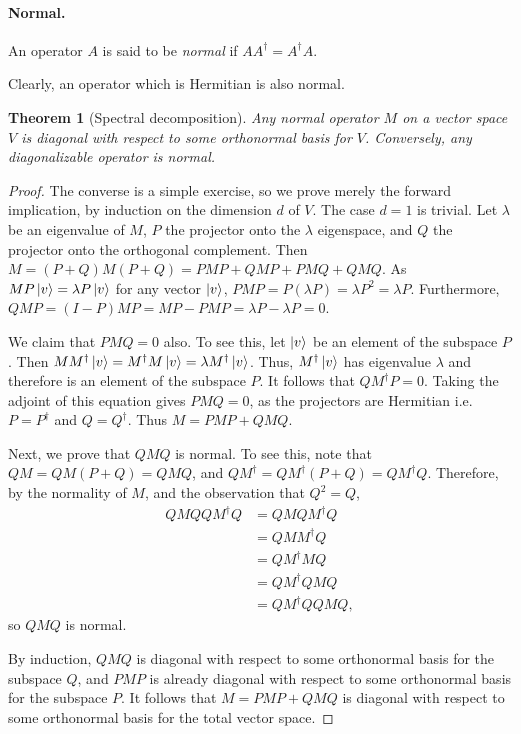 \documentclass{article}
\newtheorem{theorem}{Theorem}
\begin{document}
\paragraph{Normal.} An operator $A$ is said to be \emph{normal} if $A A^\dagger
= A^\dagger A$.

Clearly, an operator which is Hermitian is also normal.

\begin{theorem}[Spectral decomposition]
  Any normal operator $M$ on a vector space $V$ is diagonal with respect to
  some orthonormal basis for $V$. Conversely, any diagonalizable operator is
  normal.
\end{theorem}
\begin{proof}
  The converse is a simple exercise, so we prove merely the forward
  implication, by induction on the dimension $d$ of $V$. The case $d = 1$ is
  trivial. Let $\lambda$ be an eigenvalue of $M$, $P$ the projector onto the
  $\lambda$ eigenspace, and $Q$ the projector onto the orthogonal complement.
  Then $M = (P + Q)M(P + Q) = PMP + QMP + PMQ + QMQ$. As $MP\ket{v} = \lambda P
  \ket{v}$ for any vector $\ket{v}$, $PMP = P(\lambda P) = \lambda P^2 =
  \lambda P$. Furthermore, $QMP = (I - P)MP = MP - PMP = \lambda P - \lambda P
  = 0$.

  We claim that $PMQ = 0$ also. To see this, let $\ket{v}$ be an element of the
  subspace $P$. Then $M M^\dagger \ket{v} = M^\dagger M \ket{v} = \lambda
  M^\dagger \ket{v}$. Thus, $M^\dagger \ket{v}$ has eigenvalue $\lambda$ and
  therefore is an element of the subspace $P$. It follows that $Q M^\dagger P =
  0$. Taking the adjoint of this equation gives $PMQ = 0$, as the projectors
  are Hermitian i.e. $P = P^\dagger$ and $Q = Q^\dagger$. Thus $M = PMP + QMQ$.

  Next, we prove that $QMQ$ is normal. To see this, note that $QM = QM(P + Q) =
  QMQ$, and $Q M^\dagger = Q M^\dagger (P+Q) = Q M^\dagger Q$. Therefore, by
  the normality of $M$, and the observation that $Q^2 = Q$, \begin{align*}
    Q M Q Q M^\dagger Q &= Q M Q M^\dagger Q \\
      &= Q M M^\dagger Q \\
      &= Q M^\dagger M Q \\
      &= Q M^\dagger Q M Q \\
      &= Q M^\dagger Q Q M Q,
  \end{align*} so $QMQ$ is normal.

  By induction, $QMQ$ is diagonal with respect to some orthonormal basis for
  the subspace $Q$, and $PMP$ is already diagonal with respect to some
  orthonormal basis for the subspace $P$. It follows that $M = PMP + QMQ$ is
  diagonal with respect to some orthonormal basis for the total vector space.
\end{proof}
\end{document}
